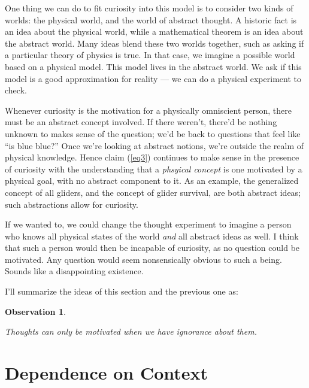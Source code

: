 \documentclass[9pt, twoside]{book}
\newtheorem{obs}{Observation}
\theoremstyle{argtstyle}
\begin{document}
One thing we can do to fit curiosity into this model is to consider two kinds
of worlds: the physical world, and the world of abstract thought.
A historic fact is an idea about the physical world, while a mathematical
theorem is an idea about the abstract world.
Many ideas blend these two worlds together, such as asking if a particular
theory of physics is true. In that case, we imagine a possible world based on a
physical model. This model lives in the abstract world. We ask if this model
is a good approximation for reality ---
we can do a physical experiment to check.

Whenever curiosity is the motivation for a physically omniscient person, there
must be an abstract concept involved. If there weren't, there'd be
nothing unknown to makes sense of the question; we'd be back to questions
that feel like
``is blue blue?''
Once we're looking at abstract
notions, we're outside the realm of physical knowledge.
Hence claim (\ref{eq3}) continues to make sense in
the presence of curiosity with the understanding that a
{\em phsyical concept} is one motivated by a physical goal, with
no abstract component to it.
As an example,
the generalized
concept of all gliders, and the concept of glider survival, are both
abstract ideas; such abstractions allow for curiosity.

If we wanted to, we could change the thought experiment to imagine a person who
knows all physical states of the world {\em and} all abstract ideas as well. I
think that such a person would then be incapable of curiosity, as no question
could be motivated. Any question would seem nonsensically obvious
to such a being. Sounds like a disappointing existence.


I'll summarize the ideas of this section and the previous one as:
\newcommand{\obsfive}{
    Thoughts can only be motivated when we have ignorance about them.
}
\begin{obs}\label{o5}
    \obsfive
\end{obs}

\section{Dependence on Context}
\end{document}
